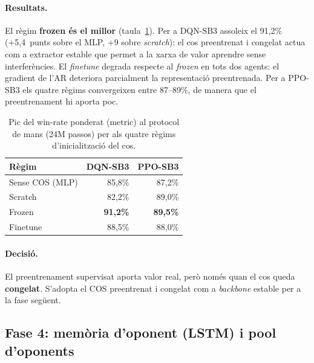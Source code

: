 \paragraph{Resultats.} El règim \textbf{frozen és el millor}
(taula~\ref{tab:fase35}). Per a DQN-SB3 assoleix el 91{,}2\% (+5{,}4~punts sobre el
\ac{MLP}, +9 sobre \emph{scratch}): el cos preentrenat i congelat actua com a extractor
estable que permet a la xarxa de valor aprendre sense interferències. El \emph{finetune}
degrada respecte al \emph{frozen} en tots dos agents: el gradient de l'\ac{AR} deteriora
parcialment la representació preentrenada. Per a PPO-SB3 els quatre règims convergeixen
entre 87--89\%, de manera que el preentrenament hi aporta poc.

\begin{table}[H]
  \centering
  \begin{tabular}{lrr}
    \toprule
    Règim & DQN-SB3 & PPO-SB3 \\
    \midrule
    Sense COS (\ac{MLP}) & 85{,}8\% & 87{,}2\% \\
    Scratch              & 82{,}2\% & 89{,}0\% \\
    Frozen               & \textbf{91{,}2\%} & \textbf{89{,}5\%} \\
    Finetune             & 88{,}5\% & 88{,}0\% \\
    \bottomrule
  \end{tabular}
  \caption{Pic del win-rate ponderat (\(\text{metric}\)) al protocol de mans (24M passos)
           per als quatre règims d'inicialització del cos.}
  \label{tab:fase35}
\end{table}

\paragraph{Decisió.} El preentrenament supervisat aporta valor real, però només quan el
cos queda \textbf{congelat}. S'adopta el COS preentrenat i congelat com a \emph{backbone}
estable per a la fase següent.

\subsection{Fase 4: memòria d'oponent (LSTM) i pool d'oponents}
\label{sec:fase4}


